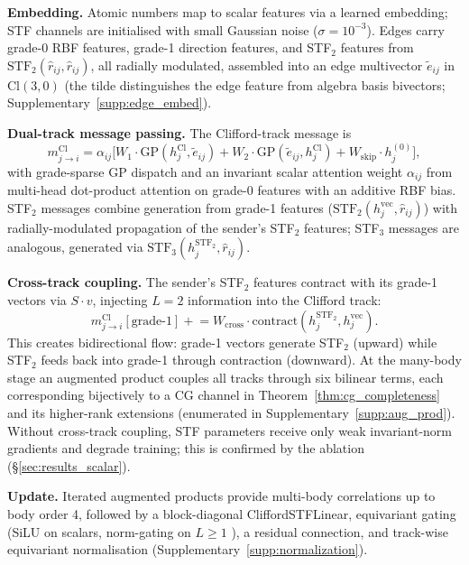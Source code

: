 \textbf{Embedding.} Atomic numbers map to scalar features via a learned embedding; STF channels are initialised with small Gaussian noise ($\sigma{=}10^{-3}$). Edges carry grade-0 RBF features, grade-1 direction features, and STF$_2$ features from $\mathrm{STF}_2(\hat{r}_{ij}, \hat{r}_{ij})$, all radially modulated, assembled into an edge multivector $\tilde{e}_{ij}$ in $\mathrm{Cl}(3,0)$ (the tilde distinguishes the edge feature from algebra basis bivectors; Supplementary~\ref{supp:edge_embed}).

\textbf{Dual-track message passing.} The Clifford-track message is
\[
m^{\mathrm{Cl}}_{j \to i} = \alpha_{ij} \bigl[W_1 \cdot \mathrm{GP}(h_j^{\mathrm{Cl}}, \tilde{e}_{ij}) + W_2 \cdot \mathrm{GP}(\tilde{e}_{ij}, h_j^{\mathrm{Cl}}) + W_{\mathrm{skip}} \cdot h_j^{(0)}\bigr],
\]
with grade-sparse GP dispatch and an invariant scalar attention weight $\alpha_{ij}$ from multi-head dot-product attention on grade-0 features with an additive RBF bias. STF$_2$ messages combine generation from grade-1 features ($\mathrm{STF}_2(h_j^{\mathrm{vec}}, \hat{r}_{ij})$) with radially-modulated propagation of the sender's STF$_2$ features; STF$_3$ messages are analogous, generated via $\mathrm{STF}_3(h_j^{\mathrm{STF}_2}, \hat{r}_{ij})$.

\textbf{Cross-track coupling.} The sender's STF$_2$ features contract with its grade-1 vectors via $S \cdot v$, injecting $L{=}2$ information into the Clifford track:
\[
m^{\mathrm{Cl}}_{j \to i}[\text{grade-1}] \mathrel{+}= W_{\mathrm{cross}} \cdot \mathrm{contract}(h_j^{\mathrm{STF}_2}, h_j^{\mathrm{vec}}).
\]
This creates bidirectional flow: grade-1 vectors generate STF$_2$ (upward) while STF$_2$ feeds back into grade-1 through contraction (downward). At the many-body stage an augmented product couples all tracks through six bilinear terms, each corresponding bijectively to a CG channel in Theorem~\ref{thm:cg_completeness} and its higher-rank extensions (enumerated in Supplementary~\ref{supp:aug_prod}). Without cross-track coupling, STF parameters receive only weak invariant-norm gradients and degrade training; this is confirmed by the ablation (\S\ref{sec:results_scalar}).

\textbf{Update.} Iterated augmented products provide multi-body correlations up to body order 4, followed by a block-diagonal CliffordSTFLinear, equivariant gating (SiLU on scalars, norm-gating on $L \geq 1$ \citep{weiler20183d}), a residual connection, and track-wise equivariant normalisation (Supplementary~\ref{supp:normalization}).

